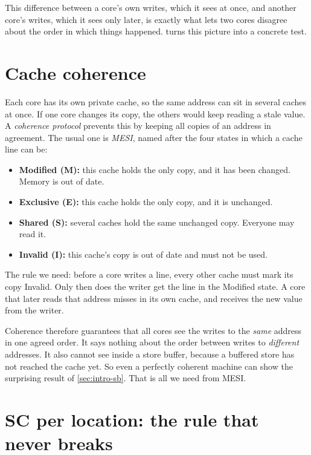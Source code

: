 This difference between a core's own writes, which it sees at once, and another core's writes, which it sees only later, is exactly what lets two cores disagree about the order in which things happened.  turns this picture into a concrete test.

\section{Cache coherence}
\label{sec:coherence}

Each core has its own private cache, so the same address can sit in several caches at once. If one core changes its copy, the others would keep reading a stale value. A \emph{coherence protocol} prevents this by keeping all copies of an address in agreement. The usual one is \emph{MESI}, named after the four states in which a cache line can be:

\begin{itemize}
  \item \textbf{Modified (M):} this cache holds the only copy, and it has been changed. Memory is out of date.
  \item \textbf{Exclusive (E):} this cache holds the only copy, and it is unchanged.
  \item \textbf{Shared (S):} several caches hold the same unchanged copy. Everyone may read it.
  \item \textbf{Invalid (I):} this cache's copy is out of date and must not be used.
\end{itemize}

The rule we need: before a core writes a line, every other cache must mark its copy Invalid. Only then does the writer get the line in the Modified state. A core that later reads that address misses in its own cache, and receives the new value from the writer.

Coherence therefore guarantees that all cores see the writes to the \emph{same} address in one agreed order. It says nothing about the order between writes to \emph{different} addresses. It also cannot see inside a store buffer, because a buffered store has not reached the cache yet. So even a perfectly coherent machine can show the surprising result of \cref{sec:intro-sb}. That is all we need from MESI.

\section{SC per location: the rule that never breaks}
\label{sec:scloc}

